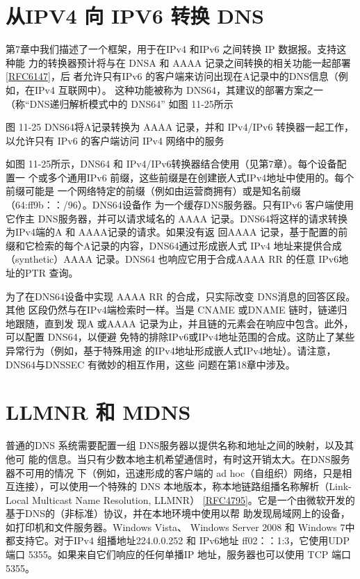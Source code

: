 \section{从IPV4 向 IPV6 转换 DNS}

第7章中我们描述了一个框架，用于在IPv4 和IPv6 之间转换 IP 数据报。支持这种能
力的转换器预计将与在 DNSA 和 AAAA 记录之间转换的相关功能一起部署\href{https://www.rfc-editor.org/rfc/rfc6147}{[RFC6147]}，后
者允许只有IPv6 的客户端来访问出现在A记录中的DNS信息（例如，在IPv4 互联网中）。
这种功能被称为 DNS64，其建议的部署方案之一（称“DNS递归解析模式中的 DNS64”
如图 11-25所示

图 11-25 DNS64将A记录转换为 AAAA 记录，并和 IPv4/IPv6 转换器一起工作，
以允许只有 IPv6 的客户端访问 IPv4 网络中的服务

如图 11-25所示，DNS64 和 IPv4/IPv6转换器结合使用（见第7章）。每个设备配置一
个或多个通用IPv6 前缀，这些前缀是在创建嵌人式IPv4地址中使用的。每个前缀可能是
一个网络特定的前缀（例如由运营商拥有）或是知名前缀（64:ff9b：：/96）。DNS64设备作
为一个缓存DNS服务器。只有IPv6 客户端使用它作主 DNS服务器，并可以请求域名的
AAAA 记录。DNS64将这样的请求转换为IPv4端的A 和 AAAA记录的请求。如果没有返
回AAAA 记录，基于配置的前缀和它检索的每个A记录的内容，DNS64通过形成嵌人式
IPv4 地址来提供合成（synthetic）AAAA 记录。DNS64 也响应它用于合成AAAA RR 的任意
IPv6地址的PTR 查询。

为了在DNS64设备中实现 AAAA RR 的合成，只实际改变 DNS消息的回答区段。其他
区段仍然与在IPv4端检索时一样。当是 CNAME 或DNAME 链时，链递归地跟随，直到发
现A 或AAAA 记录为止，并且链的元素会在响应中包含。此外，可以配置 DNS64，以便避
免特的排除IPv6或IPv4地址范围的合成。这防止了某些异常行为（例如，基于特殊用途
的IPv4地址形成嵌人式IPv4地址）。请注意，DNS64与DNSSEC 有微妙的相互作用，这些
问题在第18章中涉及。

\section{LLMNR 和 MDNS}

普通的DNS 系统需要配置一组 DNS服务器以提供名称和地址之间的映射，以及其他可
能的信息。当只有少数本地主机希望通信时，有时这开销太大。在DNS服务器不可用的情况
下（例如，迅速形成的客户端的 ad hoc（自组织）网络，只是相互连接），可以使用一个特殊的
DNS 本地版本，称本地链路组播名称解析（Link-Local Multicast Name Resolution, LLMNR）
\href{https://www.rfc-editor.org/rfc/rfc4795}{[RFC4795]}。它是一个由微软开发的基于DNS的（非标准）协议，并在本地环境中使用以帮
助发现局域网上的设备，如打印机和文件服务器。Windows Vista、 Windows Server 2008 和
Windows 7中都支持它。对于IPv4 组播地址224.0.0.252 和 IPv6地址 ff02：：1:3，它使用UDP
端口 5355。如果来自它们响应的任何单播IP 地址，服务器也可以使用 TCP 端口 5355。


